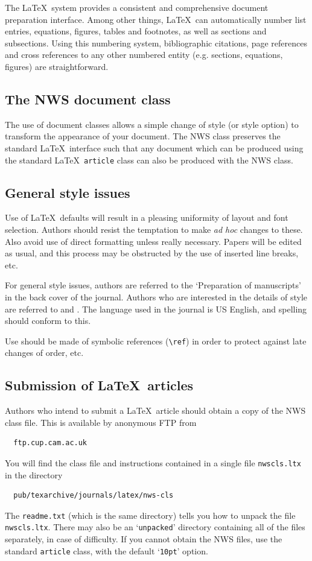 \documentclass{article}
\begin{document}
The \LaTeX\ system provides a consistent and comprehensive document preparation
interface. Among other things, \LaTeX\ can automatically number list
entries, equations, figures, tables and footnotes, as well as sections and
subsections. Using this numbering system, bibliographic citations, page
references and cross references to any other numbered entity (e.g. sections,
equations, figures) are straightforward.

\subsection{The NWS document class}

The use of document classes allows a simple change of style (or style option)
to transform the appearance of your document. The NWS class preserves the
standard \LaTeX\ interface such that any document which can be produced
using the standard \LaTeX\ \verb"article" class can also be produced with
the NWS class.

\subsection{General style issues}

Use of \LaTeX\ defaults will result in a pleasing uniformity of layout
and font selection. Authors should resist the temptation to make
\emph{ad hoc} changes to these. Also avoid use of direct formatting unless
really necessary. Papers will be edited as usual, and this process may be
obstructed by the use of inserted line breaks, etc.

For general style issues, authors are referred to the `Preparation of
manuscripts' in the back cover of the journal. Authors who are interested in
the details of style are referred to \cite{Butcher} and \cite{Chicago}. The
language used in the journal is US English, and spelling should conform
to this.

Use should be made of symbolic references (\verb"\ref") in order to
protect against late changes of order, etc.

\subsection{Submission of \LaTeX\ articles}

Authors who intend to submit a \LaTeX\ article should obtain a copy of the
NWS class file. This is available by anonymous FTP from
%
\begin{verbatim}
  ftp.cup.cam.ac.uk
\end{verbatim}
%
You will find the class file and instructions contained in a
single file \verb"nwscls.ltx" in the directory
%
\begin{verbatim}
  pub/texarchive/journals/latex/nws-cls
\end{verbatim}
%
The \verb"readme.txt" (which is the same directory) tells you how to
unpack the file \verb"nwscls.ltx".
There may also be an `\verb"unpacked"' directory containing all of the files
separately, in case of difficulty. If you cannot obtain the NWS files,
use the standard \verb"article" class, with the default `\verb"10pt"' option.
\end{document}
